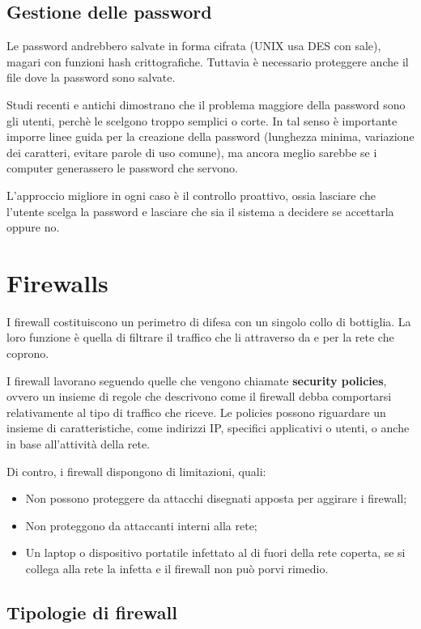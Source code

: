 \documentclass[a4paper, 10pt, twoside]{article}
\begin{document}
	\subsection{Gestione delle password}
	Le password andrebbero salvate in forma cifrata (UNIX usa DES con sale), magari con funzioni hash crittografiche. Tuttavia è necessario proteggere anche il file dove la password sono salvate.

	Studi recenti e antichi dimostrano che il problema maggiore della password sono gli utenti, perchè le scelgono troppo semplici o corte. In tal senso è importante imporre linee guida per la creazione della password (lunghezza minima, variazione dei caratteri, evitare parole di uso comune), ma ancora meglio sarebbe se i computer generassero le password che servono.

	L'approccio migliore in ogni caso è il controllo proattivo, ossia lasciare che l'utente scelga la password e lasciare che sia il sistema a decidere se accettarla oppure no.

	\section{Firewalls}
	I firewall costituiscono un perimetro di difesa con un singolo collo di bottiglia. La loro funzione è quella di filtrare il traffico che li attraverso da e per la rete che coprono.

	I firewall lavorano seguendo quelle che vengono chiamate \textbf{security policies}, ovvero un insieme di regole che descrivono come il firewall debba comportarsi relativamente al tipo di traffico che riceve. Le policies possono riguardare un insieme di caratteristiche, come indirizzi IP, specifici applicativi o utenti, o anche in base all'attività della rete.

	Di contro, i firewall dispongono di limitazioni, quali: \begin{itemize}
		\item Non possono proteggere da attacchi disegnati apposta per aggirare i firewall;
		\item Non proteggono da attaccanti interni alla rete;
		\item Un laptop o dispositivo portatile infettato al di fuori della rete coperta, se si collega alla rete la infetta e il firewall non può porvi rimedio.
	\end{itemize}

	\subsection{Tipologie di firewall}
\end{document}
